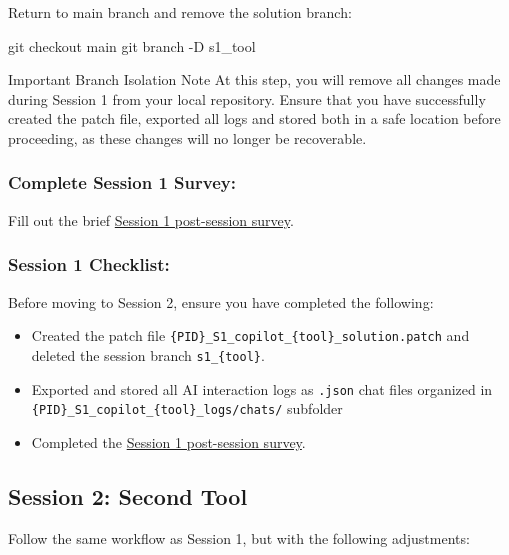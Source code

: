 \documentclass[11pt, a4paper]{article}
\begin{document}
    Return to main branch and remove the solution branch:
    \begin{codebox}
git checkout main
git branch -D s1_{tool}
    \end{codebox}
        \begin{mainbox}{Important Branch Isolation Note}
At this step, you will remove all changes made during Session 1 from your local repository. Ensure that you have successfully created the patch file, exported all logs and stored both in a safe location before proceeding, as these changes will no longer be recoverable.
        \end{mainbox}

\subsubsection*{Complete Session 1 Survey:}
\label{sec:session-1-survey}

Fill out the brief \href{https://forms.gle/dPJY5vYg6XwU4T5b8}{Session 1 post-session survey}.

\newpage

\subsubsection*{Session 1 Checklist:}
\label{sec:session-1-checklist}
Before moving to Session 2, ensure you have completed the following:
\begin{itemize}
    \item Created the patch file \verb|{PID}_S1_copilot_{tool}_solution.patch| and deleted the session branch \verb|s1_{tool}|.
    \item Exported and stored all AI interaction logs as \verb|.json| chat files\newline
    organized in \verb|{PID}_S1_copilot_{tool}_logs/chats/| subfolder
    \item Completed the \href{https://forms.gle/dPJY5vYg6XwU4T5b8}{Session 1 post-session survey}.
\end{itemize}

\subsection{Session 2: Second Tool}
\label{sec:session-2-tool-b}

Follow the same workflow as Session 1, but with the following adjustments:
\end{document}
